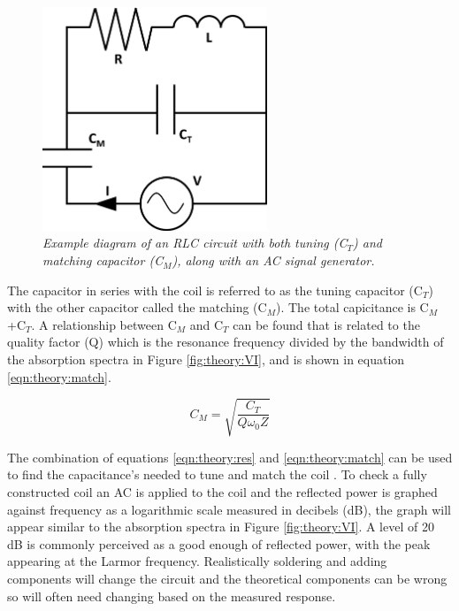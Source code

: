 \begin{figure}
    \centering
    \includegraphics[width=0.6\textwidth]{Figures/Theory/RLC_Circuit.png}
    \caption{\textit{Example diagram of an RLC circuit with both tuning (C$_T$) and matching capacitor (C$_M$), along with an AC signal generator.}}
    \label{fig:theory:RLC}
\end{figure}

The capacitor in series with the coil is referred to as the tuning capacitor (C$_T$) with the other capacitor called the matching (C$_M$). The total capicitance is C$_M$+C$_T$. A relationship between C$_M$ and C$_T$ can be found that is related to the quality factor (Q) \cite{Chen1989ChapterNoise} which is the resonance frequency divided by the bandwidth of the absorption spectra in Figure \ref{fig:theory:VI}, and is shown in equation \ref{eqn:theory:match}. 

\begin{equation}
    C_M = \sqrt{\frac{C_T}{Q\omega_0Z}}
    \label{eqn:theory:match}
\end{equation}

The combination of equations \ref{eqn:theory:res} and \ref{eqn:theory:match} can be used to find the capacitance's needed to tune and match the coil \cite{Chen1989ChapterNoise}. To check a fully constructed coil an \ac{AC} is applied to the coil and the reflected power is graphed against frequency as a logarithmic scale measured in decibels (dB), the graph will appear similar to the absorption spectra in Figure \ref{fig:theory:VI}. A level of 20 dB is commonly perceived as a good enough of reflected power, with the peak appearing at the Larmor frequency. Realistically soldering and adding components will change the circuit and the theoretical components can be wrong so will often need changing based on the measured response.

